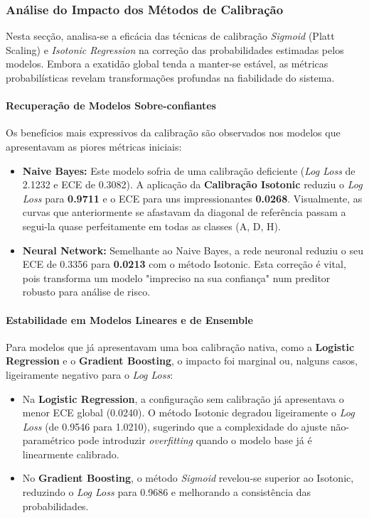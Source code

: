\documentclass[10pt]{article}
\begin{document}
\subsubsection{Análise do Impacto dos Métodos de Calibração}

Nesta secção, analisa-se a eficácia das técnicas de calibração \textit{Sigmoid} (Platt Scaling) e \textit{Isotonic Regression} na correção das probabilidades estimadas pelos modelos. Embora a exatidão global tenda a manter-se estável, as métricas probabilísticas revelam transformações profundas na fiabilidade do sistema.

\paragraph{Recuperação de Modelos Sobre-confiantes}
Os benefícios mais expressivos da calibração são observados nos modelos que apresentavam as piores métricas iniciais:
\begin{itemize}
    \item \textbf{Naive Bayes:} Este modelo sofria de uma calibração deficiente (\textit{Log Loss} de 2.1232 e ECE de 0.3082). A aplicação da \textbf{Calibração Isotonic} reduziu o \textit{Log Loss} para \textbf{0.9711} e o ECE para uns impressionantes \textbf{0.0268}. Visualmente, as curvas que anteriormente se afastavam da diagonal de referência passam a segui-la quase perfeitamente em todas as classes (A, D, H).
    \item \textbf{Neural Network:} Semelhante ao Naive Bayes, a rede neuronal reduziu o seu ECE de 0.3356 para \textbf{0.0213} com o método Isotonic. Esta correção é vital, pois transforma um modelo "impreciso na sua confiança" num preditor robusto para análise de risco.
\end{itemize}

\paragraph{Estabilidade em Modelos Lineares e de Ensemble}
Para modelos que já apresentavam uma boa calibração nativa, como a \textbf{Logistic Regression} e o \textbf{Gradient Boosting}, o impacto foi marginal ou, nalguns casos, ligeiramente negativo para o \textit{Log Loss}:
\begin{itemize}
    \item Na \textbf{Logistic Regression}, a configuração sem calibração já apresentava o menor ECE global (0.0240). O método Isotonic degradou ligeiramente o \textit{Log Loss} (de 0.9546 para 1.0210), sugerindo que a complexidade do ajuste não-paramétrico pode introduzir \textit{overfitting} quando o modelo base já é linearmente calibrado.
    \item No \textbf{Gradient Boosting}, o método \textit{Sigmoid} revelou-se superior ao Isotonic, reduzindo o \textit{Log Loss} para 0.9686 e melhorando a consistência das probabilidades.
\end{itemize}
\end{document}
